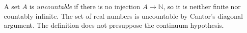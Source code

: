 
A set $A$ is \emph{uncountable} if there is no injection $A\to\mathbb N$, so it is neither finite nor countably infinite. The set of real numbers is uncountable by Cantor's diagonal argument. The definition does not presuppose the continuum hypothesis.
